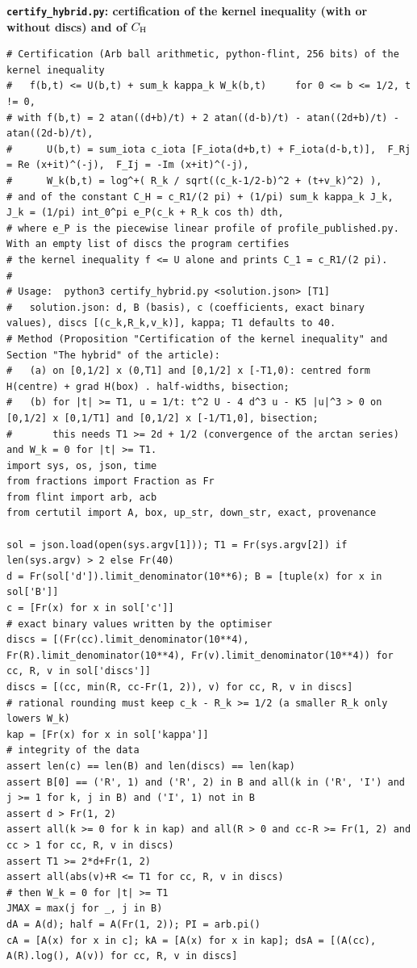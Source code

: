 \documentclass[11pt,reqno]{amsart}
\numberwithin{equation}{section}
\theoremstyle{definition}
\theoremstyle{remark}
\newcommand{\appsub}[1]{\par\medskip\noindent\textbf{#1}\par\nobreak\smallskip}
\begin{document}
\appsub{\texttt{certify\_hybrid.py}: certification of the kernel inequality (with or without discs) and of $C_{\rm H}$}
\label{app:cert_hybrid}
\begin{lstlisting}
# Certification (Arb ball arithmetic, python-flint, 256 bits) of the kernel inequality
#   f(b,t) <= U(b,t) + sum_k kappa_k W_k(b,t)     for 0 <= b <= 1/2, t != 0,
# with f(b,t) = 2 atan((d+b)/t) + 2 atan((d-b)/t) - atan((2d+b)/t) - atan((2d-b)/t),
#      U(b,t) = sum_iota c_iota [F_iota(d+b,t) + F_iota(d-b,t)],  F_Rj = Re (x+it)^(-j),  F_Ij = -Im (x+it)^(-j),
#      W_k(b,t) = log^+( R_k / sqrt((c_k-1/2-b)^2 + (t+v_k)^2) ),
# and of the constant C_H = c_R1/(2 pi) + (1/pi) sum_k kappa_k J_k,  J_k = (1/pi) int_0^pi e_P(c_k + R_k cos th) dth,
# where e_P is the piecewise linear profile of profile_published.py.  With an empty list of discs the program certifies
# the kernel inequality f <= U alone and prints C_1 = c_R1/(2 pi).
#
# Usage:  python3 certify_hybrid.py <solution.json> [T1]
#   solution.json: d, B (basis), c (coefficients, exact binary values), discs [(c_k,R_k,v_k)], kappa; T1 defaults to 40.
# Method (Proposition "Certification of the kernel inequality" and Section "The hybrid" of the article):
#   (a) on [0,1/2] x (0,T1] and [0,1/2] x [-T1,0): centred form H(centre) + grad H(box) . half-widths, bisection;
#   (b) for |t| >= T1, u = 1/t: t^2 U - 4 d^3 u - K5 |u|^3 > 0 on [0,1/2] x [0,1/T1] and [0,1/2] x [-1/T1,0], bisection;
#       this needs T1 >= 2d + 1/2 (convergence of the arctan series) and W_k = 0 for |t| >= T1.
import sys, os, json, time
from fractions import Fraction as Fr
from flint import arb, acb
from certutil import A, box, up_str, down_str, exact, provenance

sol = json.load(open(sys.argv[1])); T1 = Fr(sys.argv[2]) if len(sys.argv) > 2 else Fr(40)
d = Fr(sol['d']).limit_denominator(10**6); B = [tuple(x) for x in sol['B']]
c = [Fr(x) for x in sol['c']]                                           # exact binary values written by the optimiser
discs = [(Fr(cc).limit_denominator(10**4), Fr(R).limit_denominator(10**4), Fr(v).limit_denominator(10**4)) for cc, R, v in sol['discs']]
discs = [(cc, min(R, cc-Fr(1, 2)), v) for cc, R, v in discs]            # rational rounding must keep c_k - R_k >= 1/2 (a smaller R_k only lowers W_k)
kap = [Fr(x) for x in sol['kappa']]
# integrity of the data
assert len(c) == len(B) and len(discs) == len(kap)
assert B[0] == ('R', 1) and ('R', 2) in B and all(k in ('R', 'I') and j >= 1 for k, j in B) and ('I', 1) not in B
assert d > Fr(1, 2)
assert all(k >= 0 for k in kap) and all(R > 0 and cc-R >= Fr(1, 2) and cc > 1 for cc, R, v in discs)
assert T1 >= 2*d+Fr(1, 2)
assert all(abs(v)+R <= T1 for cc, R, v in discs)                         # then W_k = 0 for |t| >= T1
JMAX = max(j for _, j in B)
dA = A(d); half = A(Fr(1, 2)); PI = arb.pi()
cA = [A(x) for x in c]; kA = [A(x) for x in kap]; dsA = [(A(cc), A(R).log(), A(v)) for cc, R, v in discs]


\end{lstlisting}
\end{document}
